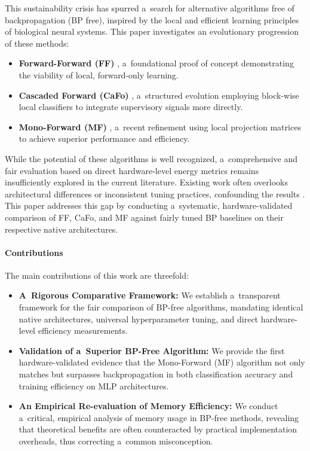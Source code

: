 \documentclass[letterpaper]{article}
\begin{document}
This sustainability crisis has spurred a~search for alternative algorithms free of backpropagation (BP free), inspired by the local and efficient learning principles of biological neural systems. This paper investigates an evolutionary progression of these methods:
\begin{itemize}
    \item \textbf{Forward-Forward (FF)} \cite{hinton2022forward}, a~foundational proof of concept demonstrating the viability of local, forward-only learning.
    \item \textbf{Cascaded Forward (CaFo)} \cite{zhao2023cafo}, a~structured evolution employing block-wise local classifiers to integrate supervisory signals more directly.
    \item \textbf{Mono-Forward (MF)} \cite{gong2025mono}, a~recent refinement using local projection matrices to achieve superior performance and efficiency.
\end{itemize}

While the potential of these algorithms is well recognized, a~comprehensive and fair evaluation based on direct hardware-level energy metrics remains insufficiently explored in the current literature. Existing work often overlooks architectural differences or inconsistent tuning practices, confounding the results \cite{desislavov2024energy}. This paper addresses this gap by conducting a~systematic, hardware-validated comparison of FF, CaFo, and MF against fairly tuned BP baselines on their respective native architectures.

\paragraph{Contributions}
The main contributions of this work are threefold:
\begin{itemize}
    \item \textbf{A~Rigorous Comparative Framework:} We establish a~transparent framework for the fair comparison of BP-free algorithms, mandating identical native architectures, universal hyperparameter tuning, and direct hardware-level efficiency measurements.
    \item \textbf{Validation of a~Superior BP-Free Algorithm:} We provide the first hardware-validated evidence that the Mono-Forward (MF) algorithm not only matches but surpasses backpropagation in both classification accuracy and training efficiency on MLP architectures.
    \item \textbf{An Empirical Re-evaluation of Memory Efficiency:} We conduct a~critical, empirical analysis of memory usage in BP-free methods, revealing that theoretical benefits are often counteracted by practical implementation overheads, thus correcting a~common misconception.
\end{itemize}
\end{document}
